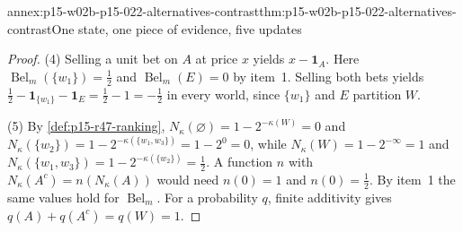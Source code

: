 \begin{annexitem}{annex:p15-w02b-p15-022-alternatives-contrast}{thm:p15-w02b-p15-022-alternatives-contrast}{One state, one piece of evidence, five updates}
\begin{proof}
(4) Selling a unit bet on \(A\) at price \(x\) yields \(x-\mathbf1_A\).
Here \(\operatorname{Bel}_m(\{w_1\})=\tfrac12\) and
\(\operatorname{Bel}_m(E)=0\) by item~1. Selling both bets yields
\(\tfrac12-\mathbf1_{\{w_1\}}-\mathbf1_E=\tfrac12-1=-\tfrac12\) in every
world, since \(\{w_1\}\) and \(E\) partition \(W\).

(5) By \cref{def:p15-r47-ranking},
\(N_\kappa(\varnothing)=1-2^{-\kappa(W)}=0\) and
\(N_\kappa(\{w_2\})=1-2^{-\kappa(\{w_1,w_3\})}=1-2^{0}=0\), while
\(N_\kappa(W)=1-2^{-\infty}=1\) and
\(N_\kappa(\{w_1,w_3\})=1-2^{-\kappa(\{w_2\})}=\tfrac12\). A function
\(n\) with \(N_\kappa(A^c)=n(N_\kappa(A))\) would need \(n(0)=1\) and
\(n(0)=\tfrac12\). By item~1 the same values hold for
\(\operatorname{Bel}_m\). For a probability \(q\), finite additivity gives
\(q(A)+q(A^c)=q(W)=1\).
\end{proof}
\end{annexitem}
